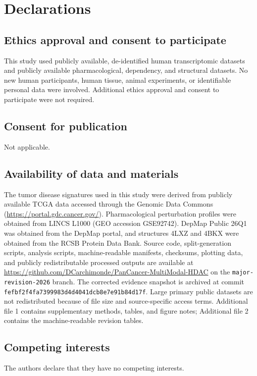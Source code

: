 \section*{Declarations}

\subsection*{Ethics approval and consent to participate}
This study used publicly available, de-identified human transcriptomic datasets and publicly available pharmacological, dependency, and structural datasets. No new human participants, human tissue, animal experiments, or identifiable personal data were involved. Additional ethics approval and consent to participate were not required.

\subsection*{Consent for publication}
Not applicable.

\subsection*{Availability of data and materials}
The tumor disease signatures used in this study were derived from publicly available TCGA data accessed through the Genomic Data Commons (\url{https://portal.gdc.cancer.gov/}). Pharmacological perturbation profiles were obtained from LINCS L1000 (GEO accession GSE92742). DepMap Public 26Q1 was obtained from the DepMap portal, and structures 4LXZ and 4BKX were obtained from the RCSB Protein Data Bank. Source code, split-generation scripts, analysis scripts, machine-readable manifests, checksums, plotting data, and publicly redistributable processed outputs are available at \url{https://github.com/DCarchimonde/PanCancer-MultiModal-HDAC} on the \texttt{major-revision-2026} branch. The corrected evidence snapshot is archived at commit \texttt{fefbf2f4fa7399983d4d4041dcb8e7e91b84d17f}. Large primary public datasets are not redistributed because of file size and source-specific access terms. Additional file 1 contains supplementary methods, tables, and figure notes; Additional file 2 contains the machine-readable revision tables.

\subsection*{Competing interests}
The authors declare that they have no competing interests.

